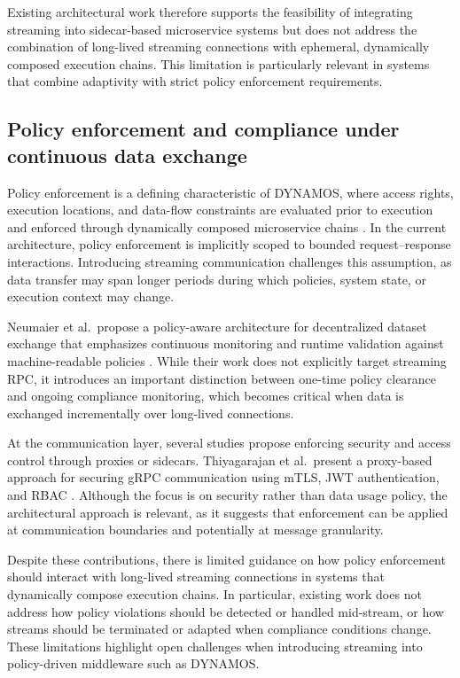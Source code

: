 \documentclass[a4paper,10pt,british]{scrartcl}
\begin{document}
Existing architectural work therefore supports the feasibility of integrating streaming into sidecar-based microservice systems but does not address the combination of long-lived streaming connections with ephemeral, dynamically composed execution chains. This limitation is particularly relevant in systems that combine adaptivity with strict policy enforcement requirements.

\subsection{Policy enforcement and compliance under continuous data exchange}

Policy enforcement is a defining characteristic of DYNAMOS, where access rights, execution locations, and data-flow constraints are evaluated prior to execution and enforced through dynamically composed microservice chains \cite{stutterheim2023thesis,stutterheim2023icsa}. In the current architecture, policy enforcement is implicitly scoped to bounded request--response interactions. Introducing streaming communication challenges this assumption, as data transfer may span longer periods during which policies, system state, or execution context may change.

Neumaier et al.\ propose a policy-aware architecture for decentralized dataset exchange that emphasizes continuous monitoring and runtime validation against machine-readable policies \cite{neumaier2021policyaware}. While their work does not explicitly target streaming RPC, it introduces an important distinction between one-time policy clearance and ongoing compliance monitoring, which becomes critical when data is exchanged incrementally over long-lived connections.

At the communication layer, several studies propose enforcing security and access control through proxies or sidecars. Thiyagarajan et al.\ present a proxy-based approach for securing gRPC communication using mTLS, JWT authentication, and RBAC \cite{thiyagarajan2025grpcsecurity}. Although the focus is on security rather than data usage policy, the architectural approach is relevant, as it suggests that enforcement can be applied at communication boundaries and potentially at message granularity.

Despite these contributions, there is limited guidance on how policy enforcement should interact with long-lived streaming connections in systems that dynamically compose execution chains. In particular, existing work does not address how policy violations should be detected or handled mid-stream, or how streams should be terminated or adapted when compliance conditions change. These limitations highlight open challenges when introducing streaming into policy-driven middleware such as DYNAMOS.
\end{document}
